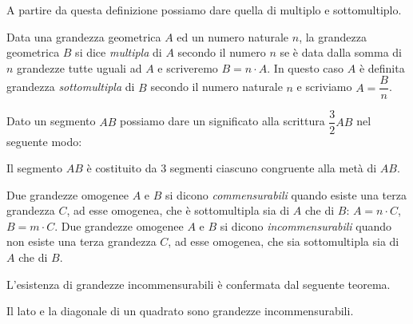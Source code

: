 A partire da questa definizione possiamo dare quella di multiplo e 
sottomultiplo.
\begin{definizione}
Data una grandezza geometrica \(A\) ed un numero naturale \(n\), la 
grandezza geometrica \(B\) si dice \emph{multipla} di \(A\) secondo il 
numero \(n\) se è data dalla somma di \(n\) grandezze tutte uguali ad \(A\) 
e scriveremo \(B=n\cdot A\). In questo caso \(A\) è definita grandezza 
\emph{sottomultipla} di \(B\) secondo il numero naturale \(n\) e 
scriviamo \(A=\dfrac{B}{n}\).
\end{definizione}

Dato un segmento \(AB\) possiamo dare un significato alla scrittura 
\(\dfrac{3}{2}AB\) nel seguente modo:

\begin{figure*}[!htb]
	\centering
\end{figure*}

Il segmento \(AB\) è costituito da 3 segmenti ciascuno congruente alla 
metà di \(AB\).
\begin{definizione}
Due grandezze omogenee \(A\) e \(B\) si dicono \emph{commensurabili} 
quando esiste una terza grandezza \(C\), ad esse omogenea, che è 
sottomultipla sia di \(A\) che di \(B\): \(A=n\cdot C\), \(B=m\cdot C\).
Due grandezze omogenee \(A\) e \(B\) si dicono \emph{incommensurabili} 
quando non esiste una terza grandezza \(C\), ad esse omogenea, che sia 
sottomultipla sia di \(A\) che di \(B\).
\end{definizione}

L'esistenza di grandezze incommensurabili è confermata dal seguente 
teorema.
\begin{teorema}
Il lato e la diagonale di un quadrato sono grandezze incommensurabili.
\end{teorema}

\begin{figure*}[!htb]
	\centering
\end{figure*}

